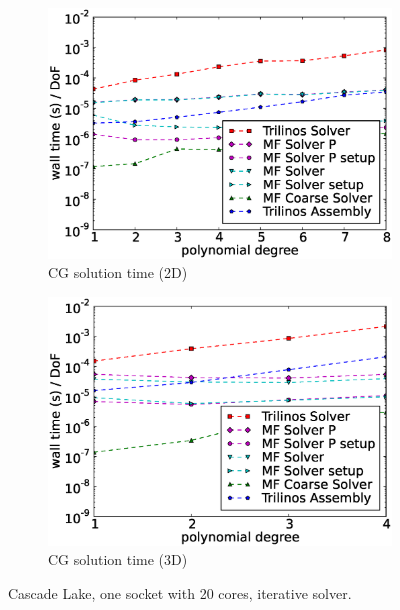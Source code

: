 \documentclass[AMA,STIX1COL]{WileyNJD-v2}
\begin{document}
\begin{figure}[!ht]
\begin{subfigure}[b]{0.49\textwidth}
  \end{subfigure}
  ~
  \begin{subfigure}[b]{0.49\textwidth}
    \centering
    \includegraphics[width=\textwidth]{CSL_Munich_solver2d.eps}
    \caption{CG solution time (2D)}
    \label{fig:benchmark_miehe_Emmy_sol2}
  \end{subfigure}
  \begin{subfigure}[b]{0.49\textwidth}
    \centering
    \includegraphics[width=\textwidth]{CSL_Munich_solver3d.eps}
    \caption{CG solution time (3D)}
    \label{fig:benchmark_miehe_Emmy_sol3}
  \end{subfigure}
  \caption{Cascade Lake, one socket with 20 cores, iterative solver.}%
  \label{fig:benchmark_miehe_Emmy_cg}
\end{figure}
\end{document}
